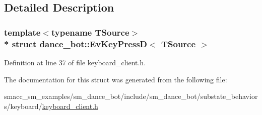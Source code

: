 \subsection{Detailed Description}
\subsubsection*{template$<$typename T\+Source$>$\\*
struct dance\+\_\+bot\+::\+Ev\+Key\+Press\+D$<$ T\+Source $>$}



Definition at line 37 of file keyboard\+\_\+client.\+h.



The documentation for this struct was generated from the following file\+:\begin{DoxyCompactItemize}
\item 
smacc\+\_\+sm\+\_\+examples/sm\+\_\+dance\+\_\+bot/include/sm\+\_\+dance\+\_\+bot/substate\+\_\+behaviors/keyboard/\hyperlink{keyboard__client_8h}{keyboard\+\_\+client.\+h}\end{DoxyCompactItemize}
